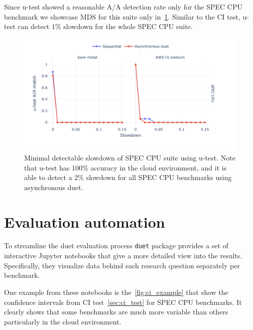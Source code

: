 Since \mbox{u-test} showed a reasonable A/A detection rate only for the SPEC CPU benchmark we showcase MDS for this suite only in~\cref{fig:mds_utest}.
Similar to the CI test, \mbox{u-test} can detect $1\%$ slowdown for the whole SPEC CPU suite.

\begin{figure}
	\centering
	\includegraphics[width=1\linewidth]{./figures/mds_utest.pdf}
	\caption{
		Minimal detectable slowdown of SPEC CPU suite using \mbox{u-test}.
		Note that \mbox{u-test} has $100\%$ accuracy in the cloud environment, and it is able to detect a $2\%$ slowdown for all SPEC CPU benchmarks using asynchronous duet.
	}
	\label{fig:mds_utest}
\end{figure}

\section{Evaluation automation}
\label{sec:automation}

To streamline the duet evaluation process \lstinline{duet} package provides a set of interactive Jupyter notebooks that give a more detailed view into the results.
Specifically, they visualize data behind each research question separately per benchmark.

One example from these notebooks is the~\cref{fig:ci_example} that show the confidence intervals from CI test~\cref{sec:ci_test} for SPEC CPU benchmarks.
It clearly shows that some benchmarks are much more variable than others particularly in the cloud environment.

